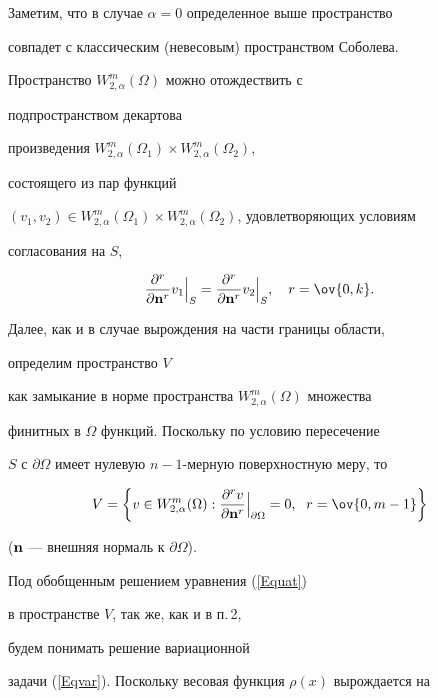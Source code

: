 Заметим, что в случае $\alpha=0$ определенное выше пространство


совпадет с классическим (невесовым) пространством Соболева. 


Пространство $W_{2, \alpha}^m(\Omega)$ можно отождествить с


подпространством декартова


произведения $W_{2, \alpha}^m(\Omega_1) \times W_{2, \alpha}^m(\Omega_2)$, 


состоящего из пар функций


$(v_1,v_2) \in W_{2, \alpha}^m(\Omega_1)


\times W_{2, \alpha}^m(\Omega_2)$, удовлетворяющих условиям


согласования на $S$,


$$


{\frac{\partial ^r}{\partial {\bold n^r}}


v_1 \Big|}_S ={\frac{\partial ^r}{\partial {\bold n^r}} v_2 \Big|}_S,


\quad r=\ov{0,k}.


$$





Далее, как и в случае вырождения на части границы области, 


определим пространство $V$ 


как замыкание в норме пространства $W_{2,\alpha}^m(\Omega)$ множества 


финитных в $\Omega$ функций. Поскольку по условию пересечение


$S$ с $\partial \Omega$ имеет нулевую $n{-}1$-мерную поверхностную меру, то 


$$


V=\bigg\{ v \in W_{2, \alpha}^m(\Omega):


{\frac{\partial ^r v}{\partial {\bold n^r}}\Big|}_{\partial \Omega}=0,


\ \;r=\ov{0,m-1}


\bigg\}


$$


(${\bold n}$ --- внешняя нормаль к $\partial \Omega$). 


Под обобщенным решением уравнения (\ref{Equat})


в пространстве $V$, так же, как и в п.\,2,


будем понимать решение вариационной 


задачи (\ref{Eqvar}). Поскольку весовая функция $\rho (x)$ вырождается на


